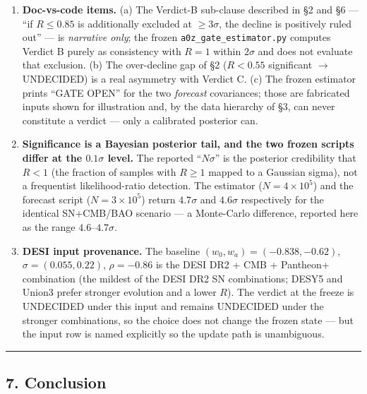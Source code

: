 \documentclass[
]{article}
\begin{document}
\begin{enumerate}
  the frozen \(z=3\) evaluation is what makes the rule self-consistent.
  This is a reason the reference redshift is fixed, but it also means
  Verdict C should never be applied to a low-\(z\) input.
\item
  \textbf{Doc-vs-code items.} (a) The Verdict-B sub-clause described in
  §2 and §6 --- ``if \(R\le0.85\) is additionally excluded at
  \(\ge3\sigma\), the decline is positively ruled out'' --- is
  \emph{narrative only}; the frozen \texttt{a0z\_gate\_estimator.py}
  computes Verdict B purely as consistency with \(R=1\) within
  \(2\sigma\) and does not evaluate that exclusion. (b) The over-decline
  gap of §2 (\(R<0.55\) significant \(\to\) UNDECIDED) is a real
  asymmetry with Verdict C. (c) The frozen estimator prints ``GATE
  OPEN'' for the two \emph{forecast} covariances; those are fabricated
  inputs shown for illustration and, by the data hierarchy of §3, can
  never constitute a verdict --- only a calibrated posterior can.
\item
  \textbf{Significance is a Bayesian posterior tail, and the two frozen
  scripts differ at the \(0.1\sigma\) level.} The reported
  ``\(N\sigma\)'' is the posterior credibility that \(R<1\) (the
  fraction of samples with \(R\ge1\) mapped to a Gaussian sigma), not a
  frequentist likelihood-ratio detection. The estimator
  (\(N=4\times10^5\)) and the forecast script (\(N=3\times10^5\)) return
  \(4.7\sigma\) and \(4.6\sigma\) respectively for the identical
  SN+CMB/BAO scenario --- a Monte-Carlo difference, reported here as the
  range \(4.6\)--\(4.7\sigma\).
\item
  \textbf{DESI input provenance.} The baseline
  \((w_0,w_a)=(-0.838,-0.62)\), \(\sigma=(0.055,0.22)\), \(\rho=-0.86\)
  is the DESI DR2 + CMB + Pantheon+ combination (the mildest of the DESI
  DR2 SN combinations; DESY5 and Union3 prefer stronger evolution and a
  lower \(R\)). The verdict at the freeze is UNDECIDED under this input
  and remains UNDECIDED under the stronger combinations, so the choice
  does not change the frozen state --- but the input row is named
  explicitly so the update path is unambiguous.
\end{enumerate}

\begin{center}\rule{0.5\linewidth}{0.5pt}\end{center}

\subsection{7. Conclusion}\label{conclusion}
\end{document}
